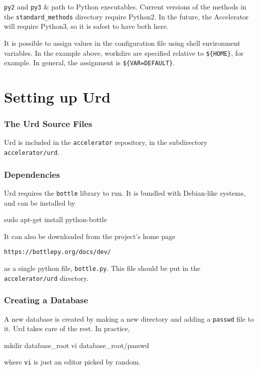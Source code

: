 \RPtwo \texttt{py2} and \texttt{py3} & path to Python executables.
Current versions of the methods in the \texttt{standard\_methods}
directory require Python2.  In the future, the Accelerator will
require Python3, so it is safest to have both here.

\stoptabletwo

It is possible to assign values in the configuration file using shell
environment variables.  In the example above, workdirs are specified
relative to \texttt{\$\{HOME\}}, for example.  In general, the
assignment is \texttt{\$\{VAR=DEFAULT\}}.



\clearpage

\section{Setting up Urd}
\subsubsection{The Urd Source Files}

Urd is included in the \texttt{accelerator} repository, in the
subdirectory \texttt{accelerator/urd}.


\subsubsection{Dependencies}
Urd requires the \texttt{bottle} library to run.  It is bundled with
Debian-like systems, and can be installed by
\begin{shell}
sudo apt-get install python-bottle
\end{shell}
It can also be downloaded from the project's home page
\begin{verbatim}
https://bottlepy.org/docs/dev/
\end{verbatim}
as a single python file, \texttt{bottle.py}.  This file should be put
in the \texttt{accelerator/urd} directory.



\subsubsection{Creating a Database}
A new database is created by making a new directory and adding
a \texttt{passwd} file to it.  Urd takes care of the rest.  In
practice,
\begin{shell}
mkdir database_root
vi database_root/passwd
\end{shell}
where \texttt{vi} is just an editor picked by random.


